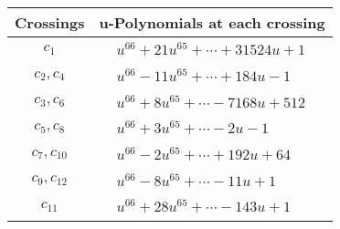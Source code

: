 \documentclass[1p]{elsarticle_modified}
\theoremstyle{definition}
\begin{document}
\begin{tabular}{m{50pt}|m{274pt}}
Crossings & \hspace{64pt}u-Polynomials at each crossing \\
\hline $$\begin{aligned}c_{1}\end{aligned}$$&$\begin{aligned}
&u^{66}+21 u^{65}+\cdots+31524 u+1
\end{aligned}$\\
\hline $$\begin{aligned}c_{2},c_{4}\end{aligned}$$&$\begin{aligned}
&u^{66}-11 u^{65}+\cdots+184 u-1
\end{aligned}$\\
\hline $$\begin{aligned}c_{3},c_{6}\end{aligned}$$&$\begin{aligned}
&u^{66}+8 u^{65}+\cdots-7168 u+512
\end{aligned}$\\
\hline $$\begin{aligned}c_{5},c_{8}\end{aligned}$$&$\begin{aligned}
&u^{66}+3 u^{65}+\cdots-2 u-1
\end{aligned}$\\
\hline $$\begin{aligned}c_{7},c_{10}\end{aligned}$$&$\begin{aligned}
&u^{66}-2 u^{65}+\cdots+192 u+64
\end{aligned}$\\
\hline $$\begin{aligned}c_{9},c_{12}\end{aligned}$$&$\begin{aligned}
&u^{66}-8 u^{65}+\cdots-11 u+1
\end{aligned}$\\
\hline $$\begin{aligned}c_{11}\end{aligned}$$&$\begin{aligned}
&u^{66}+28 u^{65}+\cdots-143 u+1
\end{aligned}$\\
\hline
\end{tabular}\\~\\
\newpage\renewcommand{\arraystretch}{1}
\end{document}
